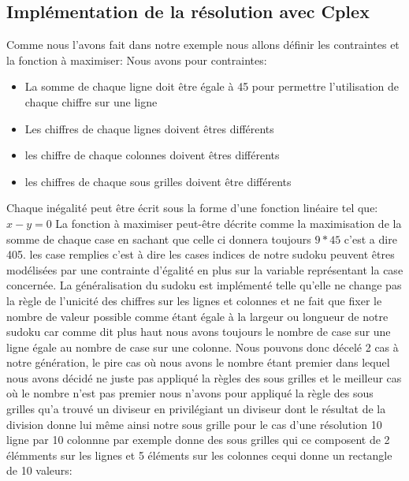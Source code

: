 \subsection{Implémentation de la résolution avec Cplex}

Comme nous l'avons fait dans notre exemple nous allons définir les contraintes et la fonction à maximiser:
Nous avons pour contraintes:
\begin{itemize}
\item La somme de chaque ligne doit être égale à 45 pour permettre l'utilisation de chaque chiffre sur une ligne
\item Les chiffres de chaque lignes doivent êtres différents
\item les chiffre de chaque colonnes doivent êtres différents
\item les chiffres de chaque sous grilles doivent être différents
\end{itemize}

Chaque inégalité peut être écrit sous la forme d'une fonction linéaire tel que:
\newline
$x-y=0$
\newline
La fonction à maximiser peut-être décrite comme la maximisation de la somme de chaque case en sachant que celle ci donnera toujours $9*45$ c'est a dire 405.
\newline
les case remplies c'est à dire les cases indices de notre sudoku peuvent êtres modélisées par une contrainte d'égalité en plus sur la variable représentant la case concernée.\newline
La généralisation du sudoku est implémenté telle qu'elle ne change pas la règle de l'unicité des chiffres sur les lignes et colonnes et ne fait que fixer le nombre de valeur possible comme étant égale à la largeur ou longueur de notre sudoku car comme dit plus haut nous avons toujours le nombre de case sur une ligne égale au nombre de case sur une colonne. Nous pouvons donc décelé 2 cas à notre génération, le pire cas où nous avons le nombre étant premier dans lequel nous avons décidé ne juste pas appliqué la règles des sous grilles et le meilleur cas où le nombre n'est pas premier nous n'avons pour appliqué la règle des sous grilles qu'a trouvé un diviseur en privilégiant un diviseur dont le résultat de la division donne lui même ainsi notre sous grille pour le cas d'une résolution 10 ligne par 10 colonnne par exemple donne des sous grilles qui ce composent de 2 élémments sur les lignes et 5 éléments sur les colonnes cequi donne un rectangle de 10 valeurs:


